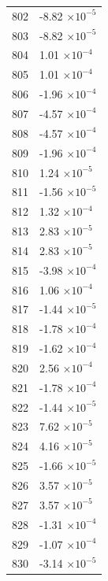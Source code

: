 \documentclass[a4paper,11pt]{article}
\begin{document}
\begin{center}
\begin{longtable}{|R{1.5cm}|R{2.5cm}|}
  802 &        -8.82 $\times 10^{          -5}$ \\
  803 &        -8.82 $\times 10^{          -5}$ \\
  804 &         1.01 $\times 10^{          -4}$ \\
  805 &         1.01 $\times 10^{          -4}$ \\
  806 &        -1.96 $\times 10^{          -4}$ \\
  807 &        -4.57 $\times 10^{          -4}$ \\
  808 &        -4.57 $\times 10^{          -4}$ \\
  809 &        -1.96 $\times 10^{          -4}$ \\
  810 &         1.24 $\times 10^{          -5}$ \\
  811 &        -1.56 $\times 10^{          -5}$ \\
  812 &         1.32 $\times 10^{          -4}$ \\
  813 &         2.83 $\times 10^{          -5}$ \\
  814 &         2.83 $\times 10^{          -5}$ \\
  815 &        -3.98 $\times 10^{          -4}$ \\
  816 &         1.06 $\times 10^{          -4}$ \\
  817 &        -1.44 $\times 10^{          -5}$ \\
  818 &        -1.78 $\times 10^{          -4}$ \\
  819 &        -1.62 $\times 10^{          -4}$ \\
  820 &         2.56 $\times 10^{          -4}$ \\
  821 &        -1.78 $\times 10^{          -4}$ \\
  822 &        -1.44 $\times 10^{          -5}$ \\
  823 &         7.62 $\times 10^{          -5}$ \\
  824 &         4.16 $\times 10^{          -5}$ \\
  825 &        -1.66 $\times 10^{          -5}$ \\
  826 &         3.57 $\times 10^{          -5}$ \\
  827 &         3.57 $\times 10^{          -5}$ \\
  828 &        -1.31 $\times 10^{          -4}$ \\
  829 &        -1.07 $\times 10^{          -4}$ \\
  830 &        -3.14 $\times 10^{          -5}$ \\

\end{longtable}
\end{center}
\end{document}
